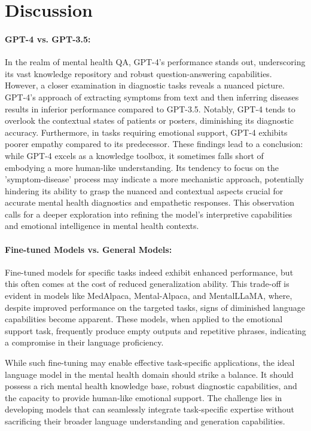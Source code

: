 
\section{Discussion}

\paragraph{GPT-4 vs. GPT-3.5:} In the realm of mental health QA, GPT-4's performance stands out, underscoring its vast knowledge repository and robust question-answering capabilities. However, a closer examination in diagnostic tasks reveals a nuanced picture. GPT-4's approach of extracting symptoms from text and then inferring diseases results in inferior performance compared to GPT-3.5. Notably, GPT-4 tends to overlook the contextual states of patients or posters, diminishing its diagnostic accuracy. Furthermore, in tasks requiring emotional support, GPT-4 exhibits poorer empathy compared to its predecessor. These findings lead to a conclusion: while GPT-4 excels as a knowledge toolbox, it sometimes falls short of embodying a more human-like understanding. Its tendency to focus on the 'symptom-disease' process may indicate a more mechanistic approach, potentially hindering its ability to grasp the nuanced and contextual aspects crucial for accurate mental health diagnostics and empathetic responses. This observation calls for a deeper exploration into refining the model's interpretive capabilities and emotional intelligence in mental health contexts.

\paragraph{Fine-tuned Models vs. General Models:} Fine-tuned models for specific tasks indeed exhibit enhanced performance, but this often comes at the cost of reduced generalization ability. This trade-off is evident in models like MedAlpaca, Mental-Alpaca, and MentalLLaMA, where, despite improved performance on the targeted tasks, signs of diminished language capabilities become apparent. These models, when applied to the emotional support task, frequently produce empty outputs and repetitive phrases, indicating a compromise in their language proficiency.

While such fine-tuning may enable effective task-specific applications, the ideal language model in the mental health domain should strike a balance. It should possess a rich mental health knowledge base, robust diagnostic capabilities, and the capacity to provide human-like emotional support. The challenge lies in developing models that can seamlessly integrate task-specific expertise without sacrificing their broader language understanding and generation capabilities.

